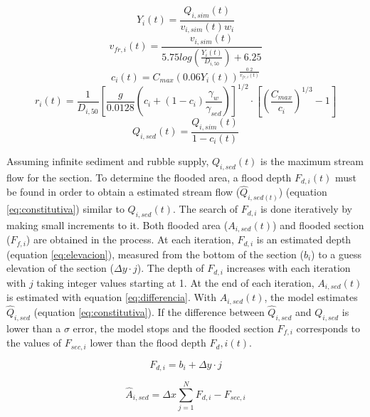 \documentclass[hess, manuscript]{copernicus}
\begin{document}
\begin{equation}
 Y_i(t) = \frac{Q_{i,sim}(t)}{v_{i,sim}(t) w_{i}}
 \label{eq:altura}
\end{equation}
\begin{equation}
 v_{fr,i}(t) = \frac{v_{i,sim}(t)}{5.75 log \left( \frac{Y_{i}(t)}{D_{i,50}} \right) + 6.25}
 \label{eq:velocidad}
\end{equation}
\begin{equation}
 c_{i}(t) = C_{max} (0.06 Y_{i}(t))^{\frac{0.2}{v_{fr,i}(t)}}
 \label{eq:con}
\end{equation}
\begin{equation}
r_{i}(t) = \frac{1}{D_{i,50}} \left [ \frac{g}{0.0128} \left( c_i+(1-c_i) \frac{\gamma_w}{\gamma_{sed}} \right ) \right ]^{1/2} \cdot \left[ \left( \frac{C_{max}}{c_i} \right )^{1/3} -1\right ]
 \label{eq:rdf}
\end{equation}
\begin{equation}
 Q_{i,sed}(t) = \frac{Q_{i,sim}(t)}{1-c_i(t)}
 \label{eq:qescombros}
\end{equation}

Assuming infinite sediment and rubble supply, $Q_{i,sed}(t)$ is the maximum stream flow for the section.  To determine the flooded area, a flood depth $F_{d,i}(t)$ must be found in order to obtain a estimated stream flow ($\hat{Q}_{{i,sed}(t)}$) (equation \ref{eq:constitutiva}) similar to $Q_{i,sed}(t)$.  The search of $F_{d,i}$ is done iteratively by making small increments to it.  Both flooded area ($A_{i,sed}(t)$) and flooded section ($F_{f,i}$) are obtained in the process.  At each iteration, $F_{d,i}$ is an estimated depth (equation \ref{eq:elevacion}), measured from the bottom of the section ($b_i$) to a guess elevation of the section ($\Delta y \cdot j$).  The depth of $F_{d,i}$ increases with each iteration with $j$ taking integer values starting at 1.  At the end of each iteration, $A_{i,sed}(t)$ is estimated with equation \ref{eq:differencia}. With $A_{i,sed}(t)$, the model estimates $\hat{Q}_{i,sed}$ (equation \ref{eq:constitutiva}).  If the difference between $\hat{Q}_{i,sed}$ and $Q_{i,sed}$ is lower than a $\sigma$ error, the model stops and the flooded section $F_{f,i}$ corresponds to the values of $F_{sec,i}$ lower than the flood depth $F_d,i (t)$.
 
 \begin{equation}
     F_{d,i} = b_i + \Delta y \cdot j
     \label{eq:elevacion}
 \end{equation}
 
 \begin{equation}
  \hat{A}_{i,sed} = \Delta x \sum_{j=1}^{N} F_{d,i} - F_{sec,i} 
  \label{eq:differencia}
 \end{equation}
 
\end{document}
